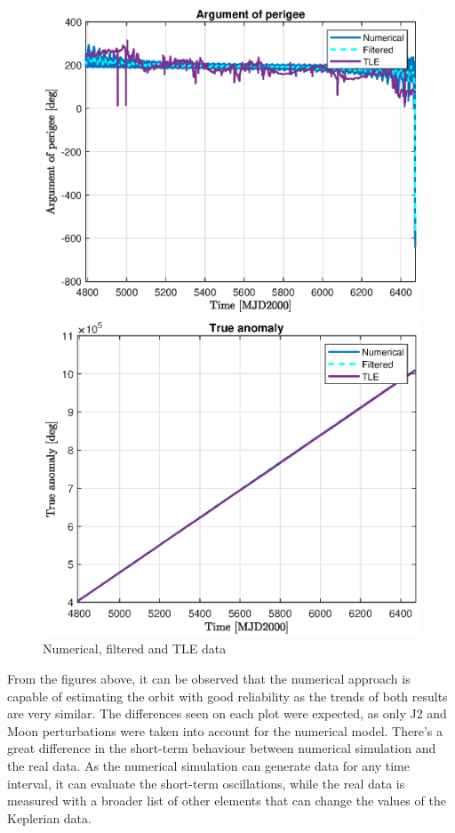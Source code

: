 \begin{figure}[H]
\begin{minipage}{0.48\linewidth}
		\includegraphics[width=\n\linewidth]{w_TLE.eps}
	\end{minipage}\hfill
	\begin{minipage}{0.48\linewidth}
		\centering
		\includegraphics[width=\n\linewidth]{TA_TLE.eps}
	\end{minipage}
	\caption{Numerical, filtered and TLE data}
	\label{fig:comparison_figures}
\end{figure}

From the figures above, it can be observed that the numerical approach is capable of estimating the orbit with good reliability as the trends of both results are very similar. The differences seen on each plot were expected, as only J2 and Moon perturbations were taken into account for the numerical model. There’s a great difference in the short-term behaviour between numerical simulation and the real data. As the numerical simulation can generate data for any time interval, it can evaluate the short-term oscillations, while the real data is measured with a broader list of other elements that can change the values of the Keplerian data. 